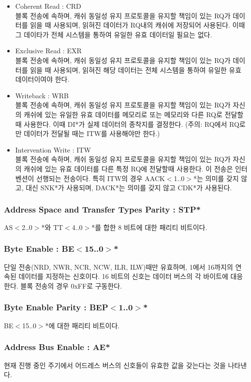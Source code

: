 \begin{itemize}
	\item Coherent Read : CRD \\
	블록 전송에 속하며,
	캐쉬 동일성 유지 프로토콜을 유지할 책임이 있는 RQ가 데이터를 읽을 때 사용되며,
	읽혀진 데이터가 RQ내의 캐쉬에 저장되어 사용된다. 이때 그 데이타가 전체 시스템을 통하여 유일한
	유효 데이터일 필요는 없다.
	\item Exclusive Read : EXR \\
	블록 전송에 속하며,
	캐쉬 동일성 유지 프로토콜을 유지할 책임이 있는 RQ가 데이터를 읽을 때 사용되며,
	읽혀진 해당 데이터는 전체 시스템을 통하여 유일한 유효 데이터이여야 한다.
	\item Writeback : WRB \\
	블록 전송에 속하며,
	캐쉬 동일성 유지 프로토콜을 유지할 책임이 있는 RQ가 자신의 캐쉬에 있는 유일한 유효 데이터를
	메모리로 또는 메모리와 다른 RQ로 전달할 때 사용한다.
	이때 DI*가 실제 데이터의 종착지를 결정한다. (주의: RQ에서 RQ로만
	데이터가 전달될 때는 ITW를 사용해야만 한다.)
	\item Intervention Write : ITW \\
	블록 전송에 속하며,
	캐쉬 동일성 유지 프로토콜을 유지할 책임이 있는 RQ가 자신의 캐쉬에 있는 유효 데이터를
	다른 특정 RQ에 전달할때 사용한다. 이 전송은 인터벤션이 선행되는 전송이다.
	특히 ITW의 경우 AACK$<$1..0$>$*는 의미를 갖지 않고,
	대신 SNK*가 사용되며, DACK*는 의미를 갖지 않고 CDK*가 사용된다.
\end{itemize}
%
\subsubsection{Address Space and Transfer Types Parity : STP*}
AS$<$2..0$>$*와 TT$<$4..0$>$*를 합한 8 비트에 대한 패리티 비트이다.
%
\subsubsection{Byte Enable : BE$<$15..0$>$*}
단일 전송(NRD, NWR, NCR, NCW, ILR, ILW)때만 유효하며,
1에서 16까지의 연속된 데이터를 지정하는 신호이다.
16 비트의 신호는 데이터 버스의 각 바이트에 대응한다.
블록 전송의 경우 0xFF로 구동한다.

%
\subsubsection{Byte Enable Parity : BEP$<$1..0$>$*}
BE$<$15..0$>$*에 대한 패리티 비트이다.

%
\subsubsection{Address Bus Enable : AE*}
현재 진행 중인 주기에서 어드레스 버스의 신호들이 유효한 값을 갖는다는 것을 나타낸다.
%
